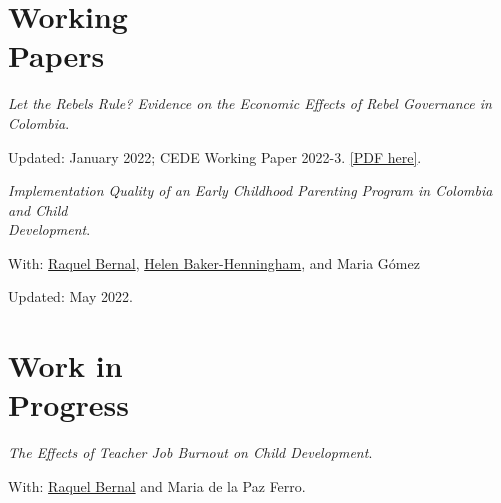 \documentclass[margin,line]{res}
\newenvironment{list1}{
  \begin{list}{\ding{113}}{%
      \setlength{\itemsep}{0in}
      \setlength{\parsep}{0in} \setlength{\parskip}{0in}
      \setlength{\topsep}{0in} \setlength{\partopsep}{0in} 
      \setlength{\leftmargin}{0.17in}}}{\end{list}}
\begin{document}
\begin{resume}




\vspace{.1cm}

\section{\sc Working \\ Papers}

\textit{Let the Rebels Rule? Evidence on the Economic Effects of Rebel Governance in Colombia}.
\begin{list1}
    \item[] Updated: January 2022; CEDE Working Paper 2022-3. \href{https://papers.ssrn.com/sol3/papers.cfm?abstract_id=4020344}{[PDF here]}. 
\end{list1}


\textit{Implementation Quality of an Early Childhood Parenting Program in Colombia and Child \\ Development}.
\begin{list1}
    \item[] With: \href{https://sites.google.com/view/raquelbernal/home}{Raquel Bernal}, \href{https://research.bangor.ac.uk/portal/en/researchers/helen-henningham(ab5999a9-22af-4394-b4f4-89dff9971ad1).html}{Helen Baker-Henningham}, and Maria Gómez  
    \item[] Updated: May 2022. 
\end{list1}


\section{\sc Work in \\ Progress}

\textit{The Effects of Teacher Job Burnout on Child Development}.
\begin{list1}
    \item[] With: \href{https://sites.google.com/view/raquelbernal/home}{Raquel Bernal} and Maria de la Paz Ferro.  
\end{list1}


\end{resume}
\end{document}
